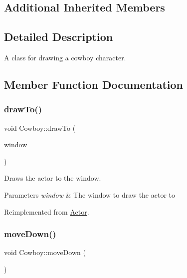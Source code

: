 \subsection*{Additional Inherited Members}


\subsection{Detailed Description}
A class for drawing a cowboy character. 



\subsection{Member Function Documentation}
\mbox{\label{classCowboy_af7e8a3e9cdcd9054b63a3661ca3f69a6}} 
\subsubsection{\texorpdfstring{drawTo()}{drawTo()}}
{\footnotesize\ttfamily void Cowboy\+::draw\+To (\begin{DoxyParamCaption}\item[{sf\+::\+Render\+Window \&}]{window }\end{DoxyParamCaption})\hspace{0.3cm}{\ttfamily [virtual]}}



Draws the actor to the window. 


\begin{DoxyParams}{Parameters}
{\em window} & The window to draw the actor to \\
\hline
\end{DoxyParams}


Reimplemented from \mbox{\hyperlink{classActor_af73a6f6670f0507c9e55ec2f61293535}{Actor}}.

\mbox{\label{classCowboy_a25b9c66203a4a5e762984ca0bed511e0}} 
\subsubsection{\texorpdfstring{moveDown()}{moveDown()}}
{\footnotesize\ttfamily void Cowboy\+::move\+Down (\begin{DoxyParamCaption}{ }\end{DoxyParamCaption})\hspace{0.3cm}{\ttfamily [virtual]}}



